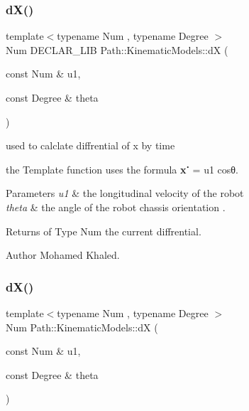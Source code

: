 \subsubsection{\texorpdfstring{d\+X()}{dX()}\hspace{0.1cm}{\footnotesize\ttfamily [1/2]}}
{\footnotesize\ttfamily template$<$typename Num , typename Degree $>$ \\
Num D\+E\+C\+L\+A\+R\+\_\+\+L\+IB Path\+::\+Kinematic\+Models\+::dX (\begin{DoxyParamCaption}\item[{const Num \&}]{u1,  }\item[{const Degree \&}]{theta }\end{DoxyParamCaption})}



used to calclate diffrential of x by time 

the Template function uses the formula {\bfseries x˙} = u1 cosθ. 
\begin{DoxyParams}{Parameters}
{\em u1} & the longitudinal velocity of the robot \\
\hline
{\em theta} & the angle of the robot chassis orientation . \\
\hline
\end{DoxyParams}
\begin{DoxyReturn}{Returns}
of Type Num the current diffrential. 
\end{DoxyReturn}
\begin{DoxyAuthor}{Author}
Mohamed Khaled. 
\end{DoxyAuthor}
\mbox{\label{namespace_path_1_1_kinematic_models_a552124dfc86f88feab9d659464ab2c3d}} 
\subsubsection{\texorpdfstring{d\+X()}{dX()}\hspace{0.1cm}{\footnotesize\ttfamily [2/2]}}
{\footnotesize\ttfamily template$<$typename Num , typename Degree $>$ \\
Num Path\+::\+Kinematic\+Models\+::dX (\begin{DoxyParamCaption}\item[{const Num \&}]{u1,  }\item[{const Degree \&}]{theta }\end{DoxyParamCaption})}



